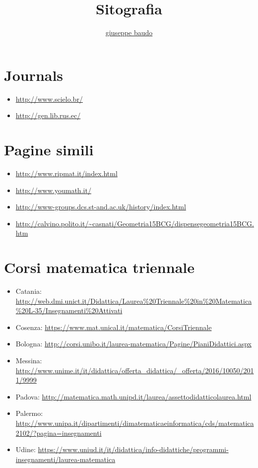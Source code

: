 \documentclass[a4paper,10pt]{article}
\title{Sitografia}
\author{\href{http://www.baudo.hol.es}{giuseppe baudo}}
\begin{document}
\maketitle

\section{Journals}
\begin{itemize}
 \item \url{http://www.scielo.br/}
 \item \url{http://gen.lib.rus.ec/}
\end{itemize}

\section{Pagine simili}
\begin{itemize}
 \item \url{http://www.ripmat.it/index.html}
 \item \url{http://www.youmath.it/}
 \item \url{http://www-groups.dcs.st-and.ac.uk/history/index.html}
 \item \url{http://calvino.polito.it/~casnati/Geometria15BCG/dispensegeometria15BCG.htm}
\end{itemize}

\section{Corsi matematica triennale}
\begin{itemize}
 \item Catania: \url{http://web.dmi.unict.it/Didattica/Laurea%20Triennale%20in%20Matematica%20L-35/Insegnamenti%20Attivati}
 \item Cosenza: \url{https://www.mat.unical.it/matematica/CorsiTriennale}
 \item Bologna: \url{http://corsi.unibo.it/laurea-matematica/Pagine/PianiDidattici.aspx}
 \item Messina: \url{http://www.unime.it/it/didattica/offerta_didattica/_offerta/2016/10050/2011/9999}
 \item Padova: \url{http://matematica.math.unipd.it/laurea/assettodidatticolaurea.html}
 \item Palermo: \url{http://www.unipa.it/dipartimenti/dimatematicaeinformatica/cds/matematica2102/?pagina=insegnamenti}
 \item Udine: \url{https://www.uniud.it/it/didattica/info-didattiche/programmi-insegnamenti/laurea-matematica}
\end{itemize}
\end{document}
